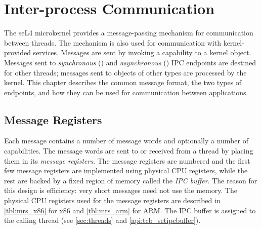 %
%
%
%

\chapter{\label{ch:ipc}Inter-process Communication}

The seL4 microkernel provides a message-passing mechanism for communication
between threads. The mechanism is also used for communication with
kernel-provided services. Messages are sent by invoking a capability to a
kernel object. Messages sent to \emph{synchronous} () and
\emph{asynchronous} () IPC endpoints are destined for other
threads; messages sent to objects of other types are processed by the kernel. This
chapter describes the common message format, the two types of endpoints,
and how they can be used for communication between applications.

\section{Message Registers}
\label{sec:messageinfo}

Each message contains a number of message words and optionally a number of
capabilities.
The message words are sent to or received from a thread by placing them in its \emph{message registers}.
The message registers are numbered and the first few message registers are implemented
using physical CPU registers, while the rest are backed by a fixed region of
memory called the \emph{IPC buffer}.
The reason for this design is efficiency:
very short messages need not use the memory.
The physical CPU registers used for the
message registers are described in \ifxeightsix\autoref{tbl:mrs_x86} for x86
and \fi \autoref{tbl:mrs_arm} for ARM.
The IPC buffer is assigned to the calling thread (see \autoref{sec:threads} and \autoref{api:tcb_setipcbuffer}).

